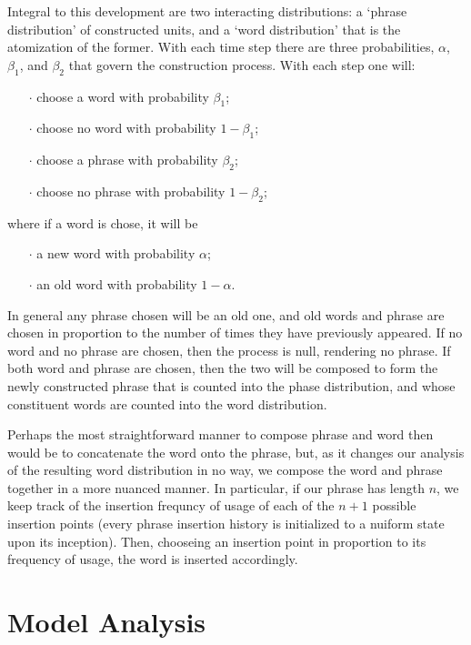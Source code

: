 Integral to this development are two interacting distributions: a
`phrase distribution' of constructed units, and a `word
distribution' that is the atomization of the former.
With each time step there are three probabilities, $\alpha$,
$\beta_1$, and $\beta_2$ that govern the construction process. With
each step one will:
\begin{itemize}
\item[$\cdot$] 
  choose a word with probability $\beta_1$;
\item[$\cdot$] 
  choose no word with probability $1-\beta_1$;
\item[$\cdot$] 
  choose a phrase with probability $\beta_2$;
\item[$\cdot$] 
  choose no phrase with probability $1-\beta_2$;
\end{itemize}
where if a word is chose, it will be
\begin{itemize}
\item[$\cdot$] 
  a new word with probability $\alpha$;
\item[$\cdot$] 
  an old word with probability $1-\alpha$.
\end{itemize}

In general any phrase chosen will be an old one, and old words and
phrase are chosen in proportion to the number of times they have
previously appeared. If no word and no phrase are chosen, then the
process is null, rendering no phrase. If both word and phrase are
chosen, then the two will be composed to form the newly constructed
phrase that is counted into the phase distribution, and whose
constituent words are counted into the word distribution.

Perhaps the most straightforward manner to compose phrase and word
then would be to concatenate the word onto the phrase, but, as it
changes our analysis of the resulting word distribution in no way, we
compose the word and phrase together in a more nuanced manner.
In particular, if our phrase has length $n$, we keep track of the
insertion frequncy of usage of each of the $n+1$ possible insertion
points (every phrase insertion history is initialized to a nuiform
state upon its inception). Then, chooseing an insertion point in
proportion to its frequency of usage, the word is inserted
accordingly.


\section{Model Analysis}
\label{sec:textpart.modelanalysis}

